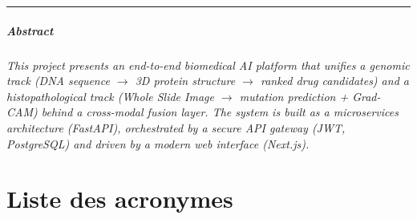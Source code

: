 \documentclass[12pt,a4paper,oneside]{book}
\begin{document}
\medskip
\noindent\rule{\linewidth}{0.4pt}

\paragraph{Abstract}
\textit{This project presents an end-to-end biomedical AI platform that unifies
a genomic track (DNA sequence $\rightarrow$ 3D protein structure $\rightarrow$
ranked drug candidates) and a histopathological track (Whole Slide Image
$\rightarrow$ mutation prediction + Grad-CAM) behind a cross-modal fusion
layer. The system is built as a microservices architecture (FastAPI),
orchestrated by a secure API gateway (JWT, PostgreSQL) and driven by a modern
web interface (Next.js).}

\tableofcontents
\newpage
\listoffigures
\newpage
\listoftables
\newpage
{}

\chapter*{Liste des acronymes}
\end{document}

